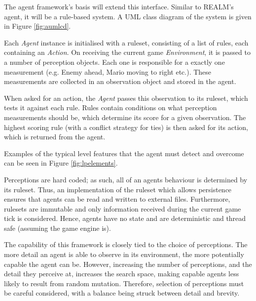 The agent framework's basis will extend this interface. Similar to REALM's agent, it will be a rule-based system. A UML class diagram of the system is given in Figure \ref{fig:aumlcd}.

\vspace{\baselineskip}

Each \emph{Agent} instance is initialised with a ruleset, consisting of a list of rules, each containing an \emph{Action}. On receiving the current game \emph{Environment}, it is passed to a number of perception objects. Each one is responsible for a exactly one measurement (e.g. Enemy ahead, Mario moving to right etc.). These measurements are collected in an observation object and stored in the agent.

When asked for an action, the \emph{Agent} passes this observation to its ruleset, which tests it against each rule. Rules contain conditions on what perception measurements should be, which determine its score for a given observation. The highest scoring rule (with a conflict strategy for ties) is then asked for its action, which is returned from the agent.

Examples of the typical level features that the agent must detect and overcome can be seen in Figure \ref{fig:lpelements}.

\vspace{\baselineskip}

Perceptions are hard coded; as such, all of an agents behaviour is determined by its ruleset. Thus, an implementation of the ruleset which allows persistence ensures that agents can be read and written to external files. Furthermore, rulesets are immutable and only information received during the current game tick is considered. Hence, agents have no state and are deterministic and thread safe (assuming the game engine is).

The capability of this framework is closely tied to the choice of perceptions. The more detail an agent is able to observe in its environment, the more potentially capable the agent can be. However, increasing the number of perceptions, and the detail they perceive at, increases the search space, making capable agents less likely to result from random mutation. Therefore, selection of perceptions must be careful considered, with a balance being struck between detail and brevity. 

